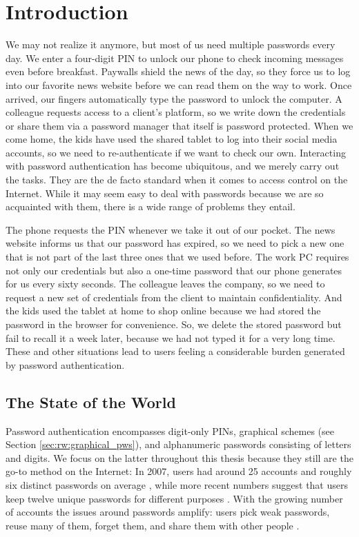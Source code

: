 \chapter[Introduction]{Introduction}\label{chap:intro}

We may not realize it anymore, but most of us need multiple passwords every day. We enter a four-digit PIN to unlock our phone to check incoming messages even before breakfast. Paywalls shield the news of the day, so they force us to log into our favorite news website before we can read them on the way to work. Once arrived, our fingers automatically type the password to unlock the computer. A colleague requests access to a client's platform, so we write down the credentials or share them via a password manager that itself is password protected. When we come home, the kids have used the shared tablet to log into their social media accounts, so we need to re-authenticate if we want to check our own. Interacting with password authentication has become ubiquitous, and we merely carry out the tasks. They are the de facto standard when it comes to access control on the Internet. While it may seem easy to deal with passwords because we are so acquainted with them, there is a wide range of problems they entail.

The phone requests the PIN whenever we take it out of our pocket. The news website informs us that our password has expired, so we need to pick a new one that is not part of the last three ones that we used before. The work PC requires not only our credentials but also a one-time password that our phone generates for us every sixty seconds. The colleague leaves the company, so we need to request a new set of credentials from the client to maintain confidentiality. And the kids used the tablet at home to shop online because we had stored the password in the browser for convenience. So, we delete the stored password but fail to recall it a week later, because we had not typed it for a very long time. These and other situations lead to users feeling a considerable burden generated by password authentication. 

\section{The State of the World}
Password authentication encompasses digit-only \glspl{PIN}, graphical schemes (see Section \ref{sec:rw:graphical_pws}), and alphanumeric passwords consisting of letters and digits. We focus on the latter throughout this thesis because they still are the go-to method on the Internet: In 2007, users had around 25 accounts and roughly six distinct passwords on average \cite{Florencio2007LargeScaleStudyPasswordHabits}, while more recent numbers suggest that users keep twelve unique passwords for different purposes \cite{Wash2016UnderstandingPasswordChoices}. With the growing number of accounts the issues around passwords amplify: users pick weak passwords, reuse many of them, forget them, and share them with other people \cite{Stobert2014PasswordLifeCycle}.  

